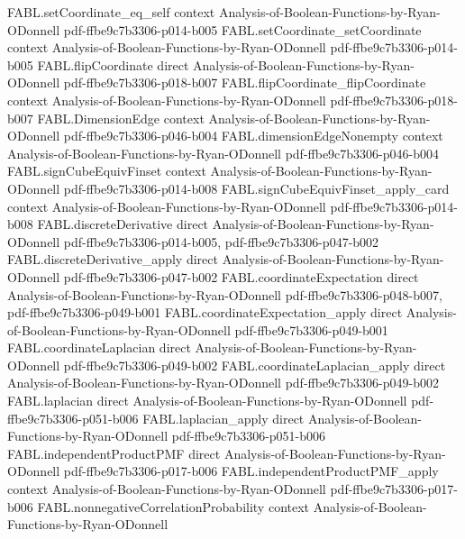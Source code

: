 \begin{theorem}
\proofstep
  {FABL.setCoordinate_eq_self}
  {context}
  {Analysis-of-Boolean-Functions-by-Ryan-ODonnell}
  {pdf-ffbe9c7b3306-p014-b005}
\proofstep
  {FABL.setCoordinate_setCoordinate}
  {context}
  {Analysis-of-Boolean-Functions-by-Ryan-ODonnell}
  {pdf-ffbe9c7b3306-p014-b005}
\proofstep
  {FABL.flipCoordinate}
  {direct}
  {Analysis-of-Boolean-Functions-by-Ryan-ODonnell}
  {pdf-ffbe9c7b3306-p018-b007}
\proofstep
  {FABL.flipCoordinate_flipCoordinate}
  {context}
  {Analysis-of-Boolean-Functions-by-Ryan-ODonnell}
  {pdf-ffbe9c7b3306-p018-b007}
\proofstep
  {FABL.DimensionEdge}
  {context}
  {Analysis-of-Boolean-Functions-by-Ryan-ODonnell}
  {pdf-ffbe9c7b3306-p046-b004}
\proofstep
  {FABL.dimensionEdgeNonempty}
  {context}
  {Analysis-of-Boolean-Functions-by-Ryan-ODonnell}
  {pdf-ffbe9c7b3306-p046-b004}
\proofstep
  {FABL.signCubeEquivFinset}
  {context}
  {Analysis-of-Boolean-Functions-by-Ryan-ODonnell}
  {pdf-ffbe9c7b3306-p014-b008}
\proofstep
  {FABL.signCubeEquivFinset_apply_card}
  {context}
  {Analysis-of-Boolean-Functions-by-Ryan-ODonnell}
  {pdf-ffbe9c7b3306-p014-b008}
\proofstep
  {FABL.discreteDerivative}
  {direct}
  {Analysis-of-Boolean-Functions-by-Ryan-ODonnell}
  {pdf-ffbe9c7b3306-p014-b005,
    pdf-ffbe9c7b3306-p047-b002}
\proofstep
  {FABL.discreteDerivative_apply}
  {direct}
  {Analysis-of-Boolean-Functions-by-Ryan-ODonnell}
  {pdf-ffbe9c7b3306-p047-b002}
\proofstep
  {FABL.coordinateExpectation}
  {direct}
  {Analysis-of-Boolean-Functions-by-Ryan-ODonnell}
  {pdf-ffbe9c7b3306-p048-b007,
    pdf-ffbe9c7b3306-p049-b001}
\proofstep
  {FABL.coordinateExpectation_apply}
  {direct}
  {Analysis-of-Boolean-Functions-by-Ryan-ODonnell}
  {pdf-ffbe9c7b3306-p049-b001}
\proofstep
  {FABL.coordinateLaplacian}
  {direct}
  {Analysis-of-Boolean-Functions-by-Ryan-ODonnell}
  {pdf-ffbe9c7b3306-p049-b002}
\proofstep
  {FABL.coordinateLaplacian_apply}
  {direct}
  {Analysis-of-Boolean-Functions-by-Ryan-ODonnell}
  {pdf-ffbe9c7b3306-p049-b002}
\proofstep
  {FABL.laplacian}
  {direct}
  {Analysis-of-Boolean-Functions-by-Ryan-ODonnell}
  {pdf-ffbe9c7b3306-p051-b006}
\proofstep
  {FABL.laplacian_apply}
  {direct}
  {Analysis-of-Boolean-Functions-by-Ryan-ODonnell}
  {pdf-ffbe9c7b3306-p051-b006}
\proofstep
  {FABL.independentProductPMF}
  {direct}
  {Analysis-of-Boolean-Functions-by-Ryan-ODonnell}
  {pdf-ffbe9c7b3306-p017-b006}
\proofstep
  {FABL.independentProductPMF_apply}
  {context}
  {Analysis-of-Boolean-Functions-by-Ryan-ODonnell}
  {pdf-ffbe9c7b3306-p017-b006}
\proofstep
  {FABL.nonnegativeCorrelationProbability}
  {context}
  {Analysis-of-Boolean-Functions-by-Ryan-ODonnell}

\end{theorem}
